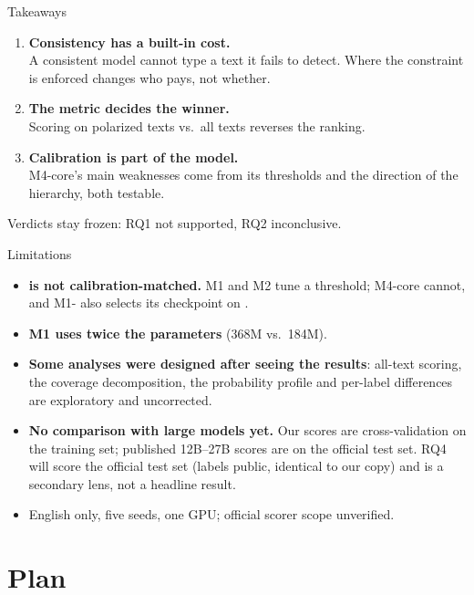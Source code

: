 \begin{frame}{Takeaways}
\begin{enumerate}
\item \textbf{Consistency has a built-in cost.}\\
  A consistent model cannot type a text it fails to detect. Where the
  constraint is enforced changes who pays, not whether.
\item \textbf{The metric decides the winner.}\\
  Scoring \TYPE{} on polarized texts vs.\ all texts reverses the ranking.
\item \textbf{Calibration is part of the model.}\\
  M4-core's main weaknesses come from its thresholds and the direction of
  the hierarchy, both testable.
\end{enumerate}
\vspace{6pt}
\small Verdicts stay frozen: RQ1 not supported, RQ2 inconclusive.
\end{frame}

\begin{frame}{Limitations}
\begin{itemize}
\item \textbf{\DET{} is not calibration-matched.} M1 and M2 tune a \DET{} threshold;
  M4-core cannot, and M1-\DET{} also selects its checkpoint on \DET{}.
\item \textbf{M1 uses twice the parameters} (368M vs.\ 184M).
\item \textbf{Some analyses were designed after seeing the results}: all-text
  scoring, the coverage decomposition, the probability profile and per-label
  differences are exploratory and uncorrected.
\item \textbf{No comparison with large models yet.} Our scores are
  cross-validation on the training set; published 12B--27B scores are on the
  official test set. RQ4 will score the official test set (labels public,
  identical to our copy) and is a secondary lens, not a headline result.
\item English only, five seeds, one GPU; official scorer scope unverified.
\end{itemize}
\end{frame}

\section{Plan}


